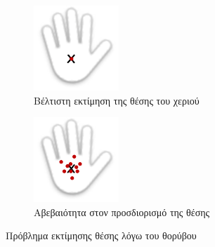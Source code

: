 \begin{figure}[H]
    \centering
    \begin{subfigure}[t]{.4\textwidth}
        \includegraphics[width=.7\textwidth, keepaspectratio]{fig/hand1.png}
        \caption{Βέλτιστη εκτίμηση της θέσης του χεριού}
        \label{fig:hand1}
    \end{subfigure}
    \begin{subfigure}[t]{.4\textwidth}
        \includegraphics[width=.7\textwidth, keepaspectratio]{fig/hand2.png}
        \caption{Αβεβαιότητα στον προσδιορισμό της θέσης}
        \label{fig:hand2}
    \end{subfigure}
    \caption{Πρόβλημα εκτίμησης θέσης λόγω του θορύβου \protect\footnotemark}
\end{figure}

